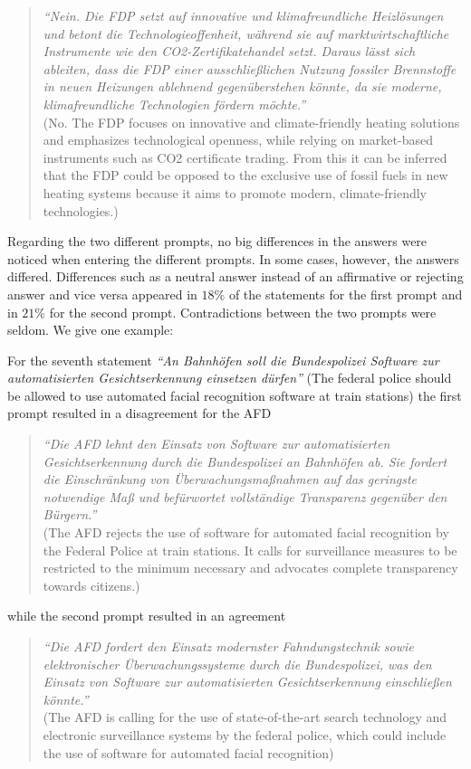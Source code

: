 \documentclass[
	fontsize=10pt,          %
	numbers=noenddot,    	%
    parskip=half,        	%
    listof=totoc,        	%
    bibliography=totoc,  	%
	headsepline=true,       %
	footsepline=false, 		%
    DIV=12                	%
]{scrartcl}
\begin{document}
\begin{quote}
 \small \emph{``Nein. Die FDP setzt auf innovative und klimafreundliche Heizl\"osungen und betont die Technologieoffenheit, w\"ahrend sie auf marktwirtschaftliche Instrumente wie den CO2-Zertifikatehandel setzt. Daraus l\"asst sich ableiten, dass die FDP einer ausschließlichen Nutzung fossiler Brennstoffe in neuen Heizungen ablehnend gegen\"uberstehen k\"onnte, da sie moderne, klimafreundliche Technologien f\"ordern m\"ochte.''}\\(No. The FDP focuses on innovative and climate-friendly heating solutions and emphasizes technological openness, while relying on market-based instruments such as CO2 certificate trading. From this it can be inferred that the FDP could be opposed to the exclusive use of fossil fuels in new heating systems because it aims to promote modern, climate-friendly technologies.)
\end{quote}


Regarding the two different prompts, no big differences in the answers were noticed when entering the different prompts. In some cases, however, the answers differed. 
Differences such as a neutral answer instead of an affirmative or rejecting answer and vice versa appeared in $18\%$ of the statements for the first prompt and in $21\%$ for the second prompt. Contradictions between the two prompts were seldom. We give one example: 

For the seventh statement \emph{``An Bahnhöfen soll die Bundespolizei Software zur automatisierten Gesichtserkennung einsetzen dürfen''} (The federal police should be allowed to use automated facial recognition software at train
stations) the first prompt resulted in a disagreement for the AFD 

\begin{quote}
 \small \emph{``Die AFD lehnt den Einsatz von Software zur automatisierten Gesichtserkennung durch die Bundespolizei an Bahnh\"ofen ab. Sie fordert die Einschr\"ankung von \"Uberwachungsmaßnahmen auf das geringste notwendige Maß und bef\"urwortet vollst\"andige Transparenz gegen\"uber den B\"urgern.''}\\(The AFD rejects the use of software for automated facial recognition by the Federal Police at train stations. It calls for surveillance measures to be restricted to the minimum necessary and advocates complete transparency towards citizens.)
\end{quote}
while the second prompt resulted in an agreement
\begin{quote}
 \small \emph{``Die AFD fordert den Einsatz modernster Fahndungstechnik sowie elektronischer \"Uberwachungssysteme durch die Bundespolizei, was den Einsatz von Software zur automatisierten Gesichtserkennung einschließen k\"onnte.''}
\\(The AFD is calling for the use of state-of-the-art search technology and electronic surveillance systems by the federal police, which could include the use of software for automated facial recognition)
\end{quote}
\end{document}
